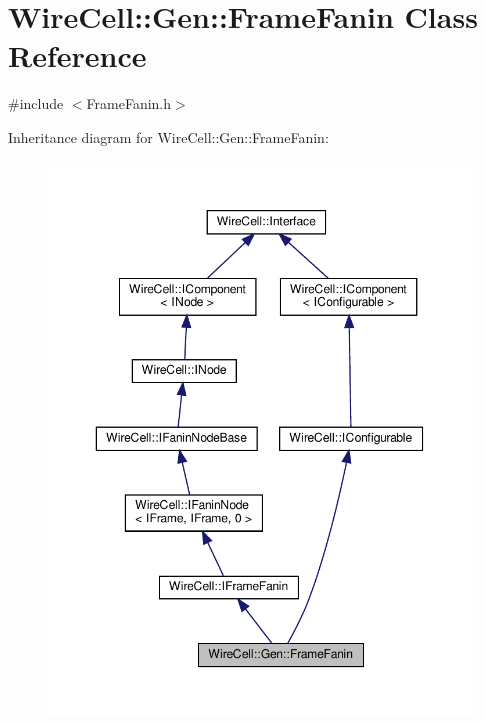 \hypertarget{class_wire_cell_1_1_gen_1_1_frame_fanin}{}\section{Wire\+Cell\+:\+:Gen\+:\+:Frame\+Fanin Class Reference}
\label{class_wire_cell_1_1_gen_1_1_frame_fanin}


{\ttfamily \#include $<$Frame\+Fanin.\+h$>$}



Inheritance diagram for Wire\+Cell\+:\+:Gen\+:\+:Frame\+Fanin\+:
\nopagebreak
\begin{figure}[H]
\begin{center}
\leavevmode
\includegraphics[width=350pt]{class_wire_cell_1_1_gen_1_1_frame_fanin__inherit__graph}
\end{center}
\end{figure}


